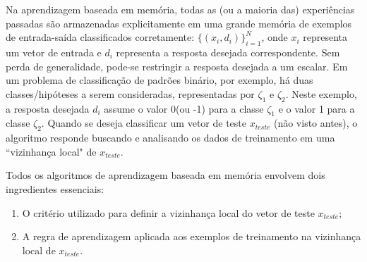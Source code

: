 Na aprendizagem baseada em memória, todas as (ou a maioria das) experiências passadas são armazenadas explicitamente em uma grande memória de exemplos de entrada-saída classificados corretamente: $ \{ ( x_i, d_i ) \}^{N}_{i=1}$, onde $x_i$ representa um vetor de entrada e $d_i$ representa a resposta desejada correspondente. Sem perda de generalidade, pode-se restringir a resposta desejada a um escalar. Em um problema de classificação de padrões binário, por exemplo, há duas classes/hipóteses a serem consideradas, representadas por $\zeta_1$ e $\zeta_2$. Neste exemplo, a resposta desejada $d_i$ assume o valor 0(ou -1) para a classe $\zeta_1$ e o valor 1 para a classe $\zeta_2$. Quando se deseja classificar um vetor de teste $x_{teste}$ (não visto antes), o algoritmo responde buscando e analisando os dados de treinamento em uma ``vizinhança local" de $x_{teste}$.

Todos os algoritmos de aprendizagem baseada em memória envolvem dois ingredientes essenciais:

\begin{enumerate}
\item O critério utilizado para definir a vizinhança local do vetor de teste $x_{teste}$;
\item A regra de aprendizagem aplicada aos exemplos de treinamento na vizinhança local de $x_{teste}$.
\end{enumerate}

